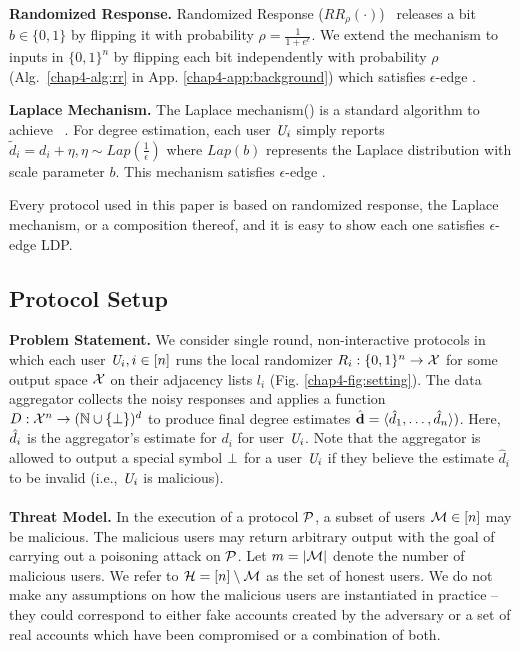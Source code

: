 \noindent\textbf{Randomized Response.} Randomized Response ($RR_\rho(\cdot)$)~\cite{RR} releases a bit $b \in \{0,1\}$ by
flipping it with probability $\rho = \frac{1}{1+e^\epsilon}$. We extend the
mechanism to inputs in $\{0,1\}^n$ by flipping each bit independently with
probability $\rho$ (Alg.~\ref{chap4-alg:rr} in App. \ref{chap4-app:background}) which satisfies
 $\epsilon$-edge \DP. 
 
\noindent\textbf{Laplace Mechanism.} 
The Laplace mechanism(\RLap) is a standard algorithm to achieve \DP~\cite{Dwork}. For degree estimation, each user $\textit{U}_i$ simply reports $\tilde{d}_i=d_i+\eta, \eta \sim Lap(\frac{1}{\epsilon})$ where $Lap(b)$ represents the Laplace distribution with scale parameter $b$. This mechanism satisfies $\epsilon$-edge \DP. 

Every protocol used in this paper is based on randomized response, the Laplace mechanism, or a composition thereof, and it is easy to show each one satisfies $\epsilon$-edge LDP.

\subsection{Protocol Setup}
\noindent\textbf{Problem Statement.}  
We consider single round,  non-interactive protocols in which each user $\textit{U}_i, i \in [n]$ runs the local randomizer
$R_i : \{0,1\}^n \rightarrow \mathcal{X}$ for some output space $\mathcal{X}$ on their adjacency lists $l_i$ (Fig. \ref{chap4-fig:setting}). The data aggregator collects the noisy responses and applies a function 
$D : \mathcal{X}^n \rightarrow (\mathbb{N} \cup \{\perp\})^d$ to produce final degree estimates  $\hat{\textbf{d}}=\langle \hat{d}_1, \ldots, \hat{d}_n\rangle)$. Here, $\hat{d}_i$ is the aggregator's estimate for $d_i$ for user $\textit{U}_i$. Note that the aggregator is allowed to output a special symbol $\perp$ for a user $\textit{U}_i$ if they believe the estimate $\hat{d}_i$ to be invalid (i.e., $\textit{U}_i$ is malicious).
    \\\\
\noindent\textbf{Threat Model.}
In the execution of a protocol $\mathcal{P}$, a subset of users $\mathcal{M} \in [n]$ may be malicious. The malicious users may return arbitrary output with the goal of carrying out a poisoning attack on  $\mathcal{P}$. Let
$m=|\mathcal{M}|$ denote the number of malicious users. We refer to 
$\mathcal{H} = [n] \setminus \mathcal{M}$ as the set of honest users.
We do not make any assumptions on how the malicious users are instantiated in practice -- they could correspond to either fake accounts created by the adversary or a set of real accounts which have been compromised or a combination of both. 

